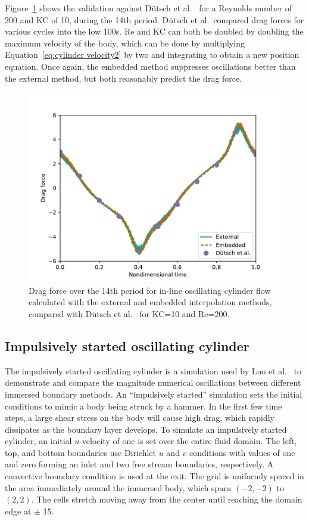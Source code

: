 \documentclass[preprint,12pt]{elsarticle}
\begin{document}
Figure~\ref{fig:KC 10} shows the validation against D\"{u}tsch et al.~\cite{dutsch1998low}
for a Reynolds number of 200 and KC of 10, during the 14th period.
D\"{u}tsch et al.\ compared drag forces for various cycles into the low 100s.
Re and KC can both be doubled by doubling the maximum velocity of the body, which can
be done by multiplying Equation~\eqref{eq:cylinder velocity2} by two and integrating to
obtain a new position equation. Once again, the embedded method suppresses oscillations
better than the external method, but both reasonably predict the drag force.
\begin{figure}[htbp]
    \centering
    \includegraphics[width=0.75\linewidth]{static_kc10.pdf}
    \caption{Drag force over the 14th period for in-line oscillating cylinder flow
    calculated with the external and embedded interpolation methods,
    compared with D\"{u}tsch et al.~\cite{dutsch1998low} for KC=10 and Re=200.}
    \label{fig:KC 10}
\end{figure}


\subsection{Impulsively started oscillating cylinder}
\label{sec:osccylinder}

The impulsively started oscillating cylinder is a simulation used by Luo et al.~\cite{Luo:2012gx}
to demonstrate and compare the magnitude numerical oscillations between different immersed boundary methods.
An ``impulsively started'' simulation sets the initial conditions to mimic a body being struck by a hammer.
In the first few time steps, a large shear stress on the body will cause high drag,
which rapidly dissipates as the boundary layer develops. To simulate an impulsively started
cylinder, an initial $u$-velocity of one is set over the entire fluid domain.
The left, top, and bottom boundaries use Dirichlet $u$ and $v$ conditions with values of
one and zero forming an inlet and two free stream boundaries, respectively.
A convective boundary condition is used at the exit.
The grid is uniformly spaced in the area immediately around the immersed body,
which spans $(-2,-2)$ to $(2,2)$. The cells stretch moving away from the center
until reaching the domain edge at $\pm$ 15.
\end{document}
